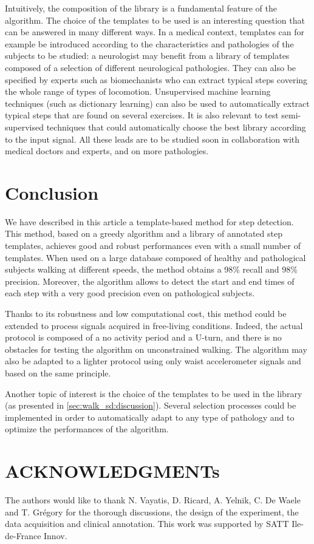 \documentclass[../thesis.tex]{subfiles}
\begin{document}
Intuitively, the composition of the library is a fundamental feature of the algorithm. The choice of the templates to be used is an interesting question that can be answered in many different ways. In a medical context, templates can for example be introduced according to the characteristics and pathologies of the subjects to be studied: a neurologist may benefit from a library of templates composed of a selection of different neurological pathologies. They can also be specified by experts such as  biomechanists who can extract typical steps covering the whole range of types of locomotion. Unsupervised machine learning techniques (such as dictionary learning) can also be used to automatically extract typical steps that are found on several exercises. It is also relevant to test  semi-supervised techniques that could automatically choose the best library according to the input signal. All these leads are to be studied soon in collaboration with medical doctors and experts, and on more pathologies.



\color{black}
\section{Conclusion}

We have described in this article a template-based method for step detection. This method, based on a greedy algorithm and a library of annotated step templates, achieves good and robust performances even with a small number of templates. When used on a large database composed of healthy and pathological subjects walking at different speeds, the method obtains  a 98\% recall and 98\% precision. Moreover, the algorithm allows to detect the start and end times of each step with a very good precision even on pathological subjects.

Thanks to its robustness and low computational cost, this method could be extended to process signals acquired in free-living conditions. Indeed, the actual protocol is composed of a no activity period and a U-turn, and there is no obstacles for testing the algorithm on unconstrained walking. The algorithm may also be adapted to a lighter protocol using only waist accelerometer signals and based on the same principle.

Another topic of interest is the choice of the templates to be used in the library (as presented in \autoref{sec:walk_sd:discussion}). Several selection processes could be implemented  in order to automatically adapt to any type of pathology and to optimize the performances of the algorithm.


\section*{ACKNOWLEDGMENTs}

The authors would like to thank N. Vayatis,  D. Ricard, A. Yelnik, C. De Waele and T. Gr{\'e}gory for the thorough discussions, the design of the experiment, the data acquisition and clinical annotation. This work was supported by SATT Ile-de-France Innov.




\stopcontents[chap7]

\biblio{}
\end{document}
